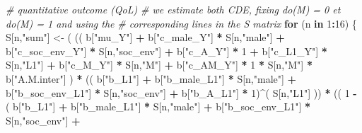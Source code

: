 \documentclass[
]{book}
\newenvironment{Shaded}{\begin{snugshade}}{\end{snugshade}}
\newcommand{\CommentTok}[1]{\textcolor[rgb]{0.56,0.35,0.01}{\textit{#1}}}
\newcommand{\ControlFlowTok}[1]{\textcolor[rgb]{0.13,0.29,0.53}{\textbf{#1}}}
\newcommand{\DecValTok}[1]{\textcolor[rgb]{0.00,0.00,0.81}{#1}}
\newcommand{\NormalTok}[1]{#1}
\newcommand{\OtherTok}[1]{\textcolor[rgb]{0.56,0.35,0.01}{#1}}
\newcommand{\SpecialCharTok}[1]{\textcolor[rgb]{0.81,0.36,0.00}{\textbf{#1}}}
\newcommand{\StringTok}[1]{\textcolor[rgb]{0.31,0.60,0.02}{#1}}
\begin{document}
\begin{Shaded}
\begin{Highlighting}[]
  \CommentTok{\# quantitative outcome (QoL)}
  \CommentTok{\# we estimate both CDE, fixing do(M) = 0 et do(M) = 1 and using the }
  \CommentTok{\# corresponding lines in the S matrix}
  \ControlFlowTok{for}\NormalTok{ (n }\ControlFlowTok{in} \DecValTok{1}\SpecialCharTok{:}\DecValTok{16}\NormalTok{) \{}
\NormalTok{    S[n,}\StringTok{"sum"}\NormalTok{] }\OtherTok{\textless{}{-}}\NormalTok{ ( (( b[}\StringTok{"mu\_Y"}\NormalTok{] }\SpecialCharTok{+} 
\NormalTok{                        b[}\StringTok{"c\_male\_Y"}\NormalTok{] }\SpecialCharTok{*}\NormalTok{ S[n,}\StringTok{"male"}\NormalTok{] }\SpecialCharTok{+} 
\NormalTok{                        b[}\StringTok{"c\_soc\_env\_Y"}\NormalTok{] }\SpecialCharTok{*}\NormalTok{ S[n,}\StringTok{"soc\_env"}\NormalTok{] }\SpecialCharTok{+} 
\NormalTok{                        b[}\StringTok{"c\_A\_Y"}\NormalTok{] }\SpecialCharTok{*} \DecValTok{1} \SpecialCharTok{+} 
\NormalTok{                        b[}\StringTok{"c\_L1\_Y"}\NormalTok{] }\SpecialCharTok{*}\NormalTok{ S[n,}\StringTok{"L1"}\NormalTok{] }\SpecialCharTok{+}
\NormalTok{                        b[}\StringTok{"c\_M\_Y"}\NormalTok{] }\SpecialCharTok{*}\NormalTok{ S[n,}\StringTok{"M"}\NormalTok{] }\SpecialCharTok{+}
\NormalTok{                        b[}\StringTok{"c\_AM\_Y"}\NormalTok{] }\SpecialCharTok{*} \DecValTok{1} \SpecialCharTok{*}\NormalTok{ S[n,}\StringTok{"M"}\NormalTok{] }\SpecialCharTok{*}\NormalTok{ b[}\StringTok{"A.M.inter"}\NormalTok{] ) }\SpecialCharTok{*}
\NormalTok{                      (( b[}\StringTok{"b\_L1"}\NormalTok{] }\SpecialCharTok{+}
\NormalTok{                           b[}\StringTok{"b\_male\_L1"}\NormalTok{] }\SpecialCharTok{*}\NormalTok{ S[n,}\StringTok{"male"}\NormalTok{] }\SpecialCharTok{+}  
\NormalTok{                           b[}\StringTok{"b\_soc\_env\_L1"}\NormalTok{] }\SpecialCharTok{*}\NormalTok{ S[n,}\StringTok{"soc\_env"}\NormalTok{] }\SpecialCharTok{+}
\NormalTok{                           b[}\StringTok{"b\_A\_L1"}\NormalTok{] }\SpecialCharTok{*} \DecValTok{1}\NormalTok{)}\SpecialCharTok{\^{}}\NormalTok{( S[n,}\StringTok{"L1"}\NormalTok{] )) }\SpecialCharTok{*}
\NormalTok{                      (( }\DecValTok{1} \SpecialCharTok{{-}}\NormalTok{ ( b[}\StringTok{"b\_L1"}\NormalTok{] }\SpecialCharTok{+}
\NormalTok{                                 b[}\StringTok{"b\_male\_L1"}\NormalTok{] }\SpecialCharTok{*}\NormalTok{ S[n,}\StringTok{"male"}\NormalTok{] }\SpecialCharTok{+}  
\NormalTok{                                 b[}\StringTok{"b\_soc\_env\_L1"}\NormalTok{] }\SpecialCharTok{*}\NormalTok{ S[n,}\StringTok{"soc\_env"}\NormalTok{] }\SpecialCharTok{+}

\end{Highlighting}
\end{Shaded}
\end{document}
